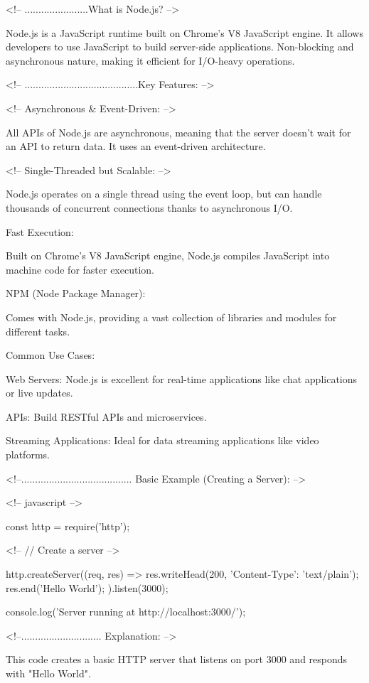 <!-- .......................What is Node.js? -->

Node.js is a JavaScript runtime built on Chrome's V8 JavaScript engine.
It allows developers to use JavaScript to build server-side applications.
Non-blocking and asynchronous nature, making it efficient for I/O-heavy operations.


<!-- .........................................Key Features: -->

<!-- Asynchronous & Event-Driven: -->

All APIs of Node.js are asynchronous, meaning that the server doesn't wait for an API to return data.
It uses an event-driven architecture.

<!-- Single-Threaded but Scalable: -->

Node.js operates on a single thread using the event loop, but can handle thousands of concurrent connections thanks to asynchronous I/O.


    Fast Execution:

Built on Chrome’s V8 JavaScript engine, Node.js compiles JavaScript into machine code for faster execution.

    NPM (Node Package Manager):

Comes with Node.js, providing a vast collection of libraries and modules for different tasks.

    Common Use Cases:

Web Servers: Node.js is excellent for real-time applications like chat applications or live updates.

    APIs: Build RESTful APIs and microservices.

Streaming Applications: Ideal for data streaming applications like video platforms.


<!--........................................ Basic Example (Creating a Server): -->

<!-- javascript -->

const http = require('http');

<!-- // Create a server -->

 http.createServer((req, res) => {
    res.writeHead(200, {'Content-Type': 'text/plain'});
    res.end('Hello World\n');
}).listen(3000);   

console.log('Server running at http://localhost:3000/');



<!--............................. Explanation: -->

This code creates a basic HTTP server that listens on port 3000 and responds with "Hello World".


